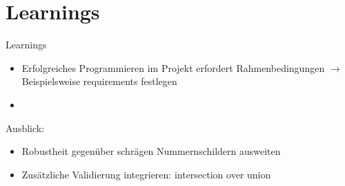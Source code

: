 \section{Learnings}

\begin{frame}{Learnings}
    \begin{itemize}
        \item Erfolgreiches Programmieren im Projekt erfordert Rahmenbedingungen 
        $\rightarrow$ Beispielsweise requirements festlegen
        \item 
    \end{itemize}
    
    Ausblick:
    \begin{itemize}
        \item Robustheit gegenüber schrägen Nummernschildern ausweiten
        \item Zusätzliche Validierung integrieren: intersection over union
    \end{itemize}
\end{frame}

